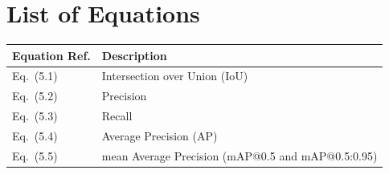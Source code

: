 \chapter*{List of Equations}

\begin{center}
\begin{tabular}{@{}ll@{}}
\toprule
\textbf{Equation Ref.} & \textbf{Description}\\
\midrule
Eq.\ (5.1) & Intersection over Union (IoU)\\
Eq.\ (5.2) & Precision\\
Eq.\ (5.3) & Recall\\
Eq.\ (5.4) & Average Precision (AP)\\
Eq.\ (5.5) & mean Average Precision (mAP@0.5 and mAP@0.5:0.95)\\
\bottomrule
\end{tabular}
\end{center}
